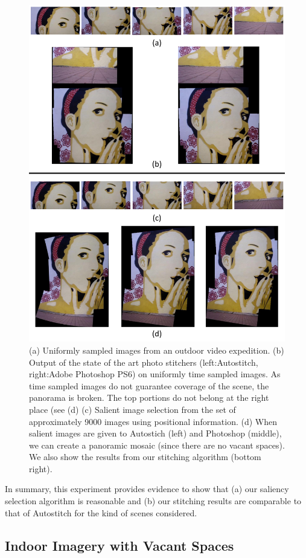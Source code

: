 \begin{figure}[h!]
\centering
\includegraphics[width=0.87\linewidth]{figures/ValidationResult}
\caption{ (a) Uniformly sampled images from an outdoor video
  expedition.  (b) Output of the state of the art photo stitchers
  (left:Autostitch, right:Adobe Photoshop PS6) on uniformly time
  sampled images.  As time sampled images do not guarantee coverage of
  the scene, the panorama is broken. The top portions do not belong at
  the right place (see (d) (c) Salient image selection from the set of
  approximately 9000 images using positional information. (d) When
  salient images are given to Autostich (left) and Photoshop (middle),
  we can create a panoramic mosaic (since there are no vacant
  spaces). We also show the results from our stitching algorithm
  (bottom right).}
\label{fig:sac3}
\end{figure}

In summary, this experiment provides evidence to show that (a) our
saliency selection algorithm is reasonable and (b) our stitching
results are comparable to that of Autostitch for the kind of scenes
considered.

\subsection{Indoor Imagery with Vacant Spaces}

